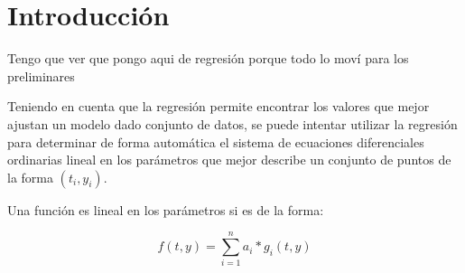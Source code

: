 \chapter*{Introducción}\label{chapter:introduction}

\qquad

Tengo que ver que pongo aqui de regresión porque todo lo moví para los preliminares




Teniendo en cuenta que la regresión permite encontrar los valores que mejor ajustan un modelo dado conjunto de datos, se puede intentar utilizar la regresión para determinar de forma automática el sistema de ecuaciones diferenciales ordinarias lineal en los parámetros que mejor describe un conjunto de puntos de la forma $(t_i, y_i)$.

Una función es lineal en los parámetros si es de la forma:

$$f(t,y) = \sum_{i=1}^{n} a_i * g_i(t, y)$$

